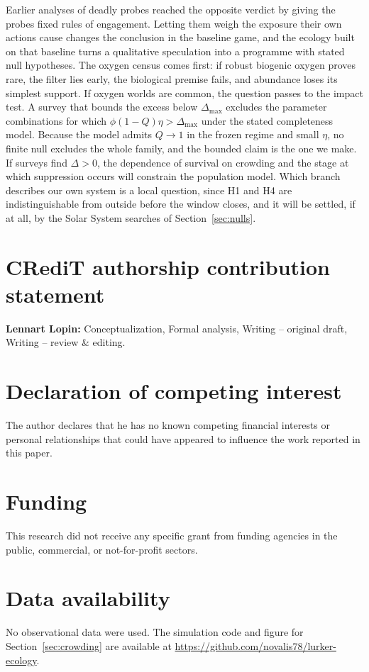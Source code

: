 \documentclass[preprint,12pt]{elsarticle}
\theoremstyle{definition}
\begin{document}
Earlier analyses of deadly probes reached the opposite verdict by giving the probes fixed rules of engagement. Letting them weigh the exposure their own actions cause changes the conclusion in the baseline game, and the ecology built on that baseline turns a qualitative speculation into a programme with stated null hypotheses. The oxygen census comes first: if robust biogenic oxygen proves rare, the filter lies early, the biological premise fails, and abundance loses its simplest support. If oxygen worlds are common, the question passes to the impact test. A survey that bounds the excess below $\Delta_{\max}$ excludes the parameter combinations for which $\phi(1-Q)\eta > \Delta_{\max}$ under the stated completeness model. Because the model admits $Q \to 1$ in the frozen regime and small $\eta$, no finite null excludes the whole family, and the bounded claim is the one we make. If surveys find $\Delta > 0$, the dependence of survival on crowding and the stage at which suppression occurs will constrain the population model. Which branch describes our own system is a local question, since H1 and H4 are indistinguishable from outside before the window closes, and it will be settled, if at all, by the Solar System searches of Section~\ref{sec:nulls}.

\section*{CRediT authorship contribution statement}
\textbf{Lennart Lopin:} Conceptualization, Formal analysis, Writing -- original draft, Writing -- review \& editing.

\section*{Declaration of competing interest}
The author declares that he has no known competing financial interests or personal relationships that could have appeared to influence the work reported in this paper.

\section*{Funding}
This research did not receive any specific grant from funding agencies in the public, commercial, or not-for-profit sectors.

\section*{Data availability}
No observational data were used. The simulation code and figure for Section~\ref{sec:crowding} are available at \url{https://github.com/novalis78/lurker-ecology}.
\end{document}
